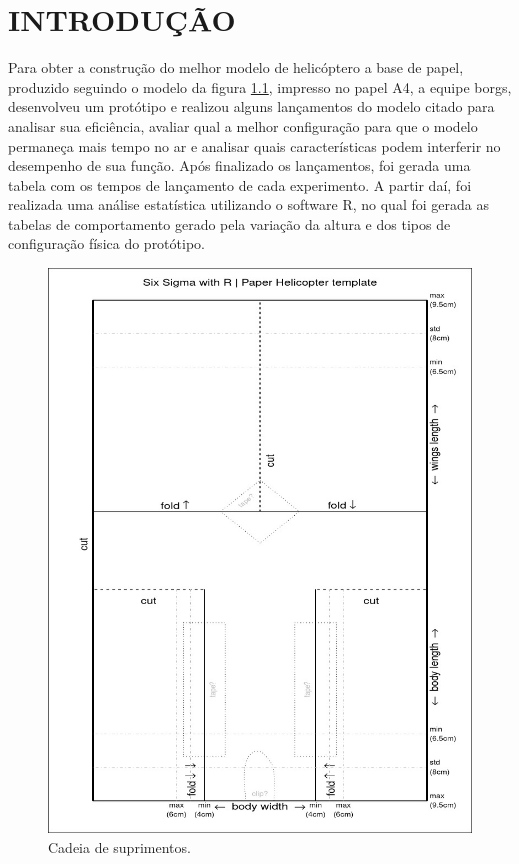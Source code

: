 \chapter{INTRODUÇÃO}
\label{chap:intro}
Para obter a construção do melhor modelo de helicóptero a base de papel, produzido seguindo o modelo da figura \ref{fig:modeloA4}, impresso no papel A4, a equipe borgs, desenvolveu um protótipo e realizou alguns lançamentos do modelo citado para analisar sua eficiência, avaliar qual a melhor configuração para que o modelo permaneça mais tempo no ar e analisar quais características podem interferir no desempenho de sua função. Após finalizado os lançamentos, foi gerada uma tabela com os tempos de lançamento de cada experimento.  A partir daí, foi realizada uma análise estatística utilizando o software R, no qual foi gerada as tabelas de comportamento gerado pela variação da altura e dos tipos de configuração física do protótipo.

\begin{figure}[H]
    \centering
    \includegraphics[scale=0.4]{images/helicoptero.jpeg}
    \caption{Cadeia de suprimentos.}
    \label{fig:modeloA4}
  \end{figure}

